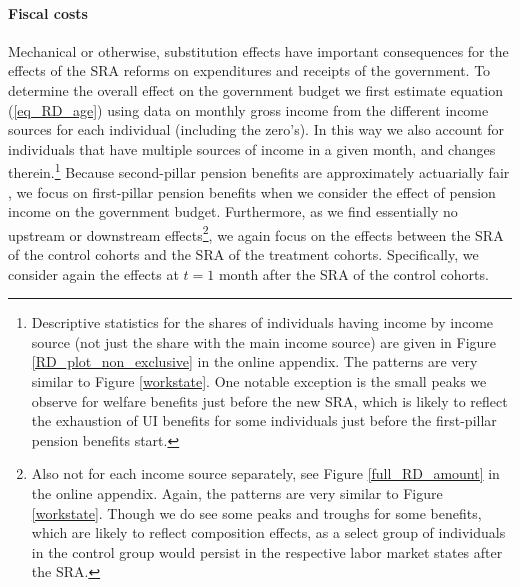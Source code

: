 \documentclass[12pt,a4paper]{article}
\begin{document}
\paragraph{Fiscal costs}  

Mechanical or otherwise, substitution effects have important consequences for the effects of the SRA reforms on expenditures and receipts of the government. To determine the overall effect on the government budget we first estimate equation (\ref{eq_RD_age}) using data on monthly gross income from the different income sources for each individual (including the zero's). In this way we also account for individuals that have multiple sources of income in a given month, and changes therein.\footnote{Descriptive statistics for the shares of individuals having income by income source (not just the share with the main income source) are given in Figure \ref{RD_plot_non_exclusive} in the online appendix. The patterns are very similar to Figure \ref{workstate}. One notable exception is the small peaks we observe for welfare benefits just before the new SRA, which is likely to reflect the exhaustion of UI benefits for some individuals just before the first-pillar pension benefits start.} Because second-pillar pension benefits are approximately actuarially fair \citep{de_vos_social_2019}, we focus on first-pillar pension benefits when we consider the effect of pension income on the government budget. %
Furthermore, as we find essentially no upstream or downstream effects\footnote{Also not for each income source separately, see Figure \ref{full_RD_amount} in the online appendix. Again, the patterns are very similar to Figure \ref{workstate}. Though we do see some peaks and troughs for some benefits, which are likely to reflect composition effects, as a select group of individuals in the control group would persist in the respective labor market states after the SRA.}, we again focus on the effects between the SRA of the control cohorts and the SRA of the treatment cohorts. Specifically, we consider again the effects at $t=1$ month after the SRA of the control cohorts.
\end{document}
